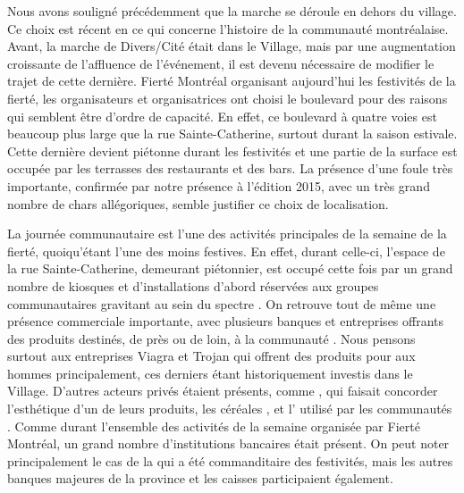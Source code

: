 Nous avons souligné précédemment que la marche se déroule en dehors du village.
Ce choix est récent en ce qui concerne l'histoire de la communauté \lgbt{} montréalaise.
Avant, la marche de Divers/Cité était dans le Village, mais par une augmentation croissante de l'affluence de l'événement, il est devenu nécessaire de modifier le trajet de cette dernière.
Fierté Montréal organisant aujourd'hui les festivités de la fierté, les organisateurs et organisatrices ont choisi le boulevard pour des raisons qui semblent être d'ordre de capacité.
En effet, ce boulevard à quatre voies est beaucoup plus large que la rue Sainte-Catherine, surtout durant la saison estivale.
Cette dernière devient piétonne durant les festivités et une partie de la surface est occupée par les terrasses des restaurants et des bars.
La présence d'une foule très importante, confirmée par notre présence à l'édition 2015, avec un très grand nombre de chars allégoriques, semble justifier ce choix de localisation.

La journée communautaire est l'une des activités principales de la semaine de la fierté, quoiqu’étant l'une des moins festives.
En effet, durant celle-ci, l'espace de la rue Sainte-Catherine, demeurant piétonnier, est occupé cette fois par un grand nombre de kiosques et d'installations d'abord réservées aux groupes communautaires gravitant au sein du spectre \lgbt.
On retrouve tout de même une présence commerciale importante, avec plusieurs banques et entreprises offrants des produits destinés, de près ou de loin, à la communauté \lgbt.
Nous pensons surtout aux entreprises Viagra et Trojan qui offrent des produits pour aux hommes principalement, ces derniers étant historiquement investis dans le Village.
D'autres acteurs privés étaient présents, comme , qui faisait concorder l'esthétique d'un de leurs produits, les céréales , et l' utilisé par les communautés \lgbt.
Comme durant l'ensemble des activités de la semaine organisée par Fierté Montréal, un grand nombre d'institutions bancaires était présent.
On peut noter principalement le cas de la  qui a été commanditaire des festivités, mais les autres banques majeures de la province et les caisses  participaient également.

